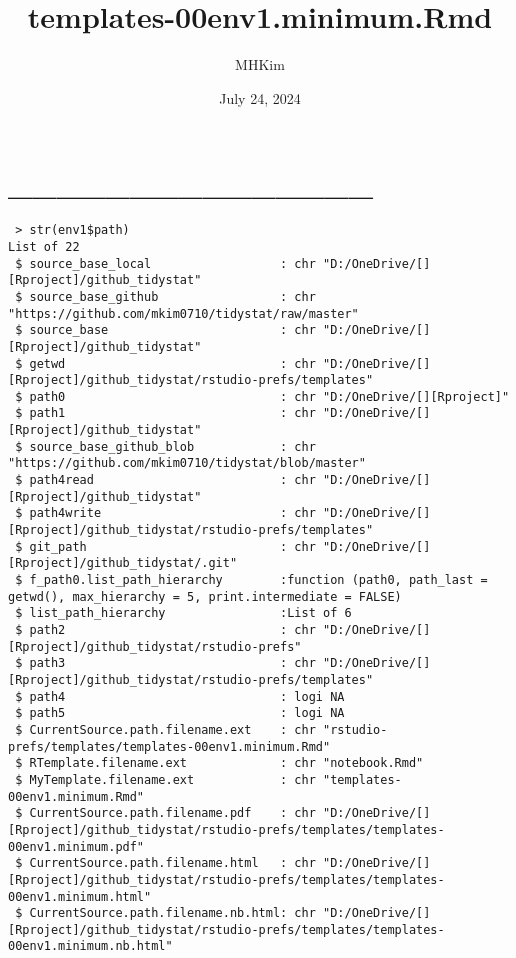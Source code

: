 \documentclass[
]{article}
\title{templates-00env1.minimum.Rmd}
\author{MHKim}
\date{July 24, 2024}
\begin{document}
\maketitle

{
\setcounter{tocdepth}{6}
\tableofcontents
}
\hypertarget{section}{%
\section{\_\_\_\_\_\_\_\_\_\_\_\_\_\_\_}\label{section}}

\begin{verbatim}
 > str(env1$path)
List of 22
 $ source_base_local                  : chr "D:/OneDrive/[][Rproject]/github_tidystat"
 $ source_base_github                 : chr "https://github.com/mkim0710/tidystat/raw/master"
 $ source_base                        : chr "D:/OneDrive/[][Rproject]/github_tidystat"
 $ getwd                              : chr "D:/OneDrive/[][Rproject]/github_tidystat/rstudio-prefs/templates"
 $ path0                              : chr "D:/OneDrive/[][Rproject]"
 $ path1                              : chr "D:/OneDrive/[][Rproject]/github_tidystat"
 $ source_base_github_blob            : chr "https://github.com/mkim0710/tidystat/blob/master"
 $ path4read                          : chr "D:/OneDrive/[][Rproject]/github_tidystat"
 $ path4write                         : chr "D:/OneDrive/[][Rproject]/github_tidystat/rstudio-prefs/templates"
 $ git_path                           : chr "D:/OneDrive/[][Rproject]/github_tidystat/.git"
 $ f_path0.list_path_hierarchy        :function (path0, path_last = getwd(), max_hierarchy = 5, print.intermediate = FALSE)  
 $ list_path_hierarchy                :List of 6
 $ path2                              : chr "D:/OneDrive/[][Rproject]/github_tidystat/rstudio-prefs"
 $ path3                              : chr "D:/OneDrive/[][Rproject]/github_tidystat/rstudio-prefs/templates"
 $ path4                              : logi NA
 $ path5                              : logi NA
 $ CurrentSource.path.filename.ext    : chr "rstudio-prefs/templates/templates-00env1.minimum.Rmd"
 $ RTemplate.filename.ext             : chr "notebook.Rmd"
 $ MyTemplate.filename.ext            : chr "templates-00env1.minimum.Rmd"
 $ CurrentSource.path.filename.pdf    : chr "D:/OneDrive/[][Rproject]/github_tidystat/rstudio-prefs/templates/templates-00env1.minimum.pdf"
 $ CurrentSource.path.filename.html   : chr "D:/OneDrive/[][Rproject]/github_tidystat/rstudio-prefs/templates/templates-00env1.minimum.html"
 $ CurrentSource.path.filename.nb.html: chr "D:/OneDrive/[][Rproject]/github_tidystat/rstudio-prefs/templates/templates-00env1.minimum.nb.html"
\end{verbatim}
\end{document}
